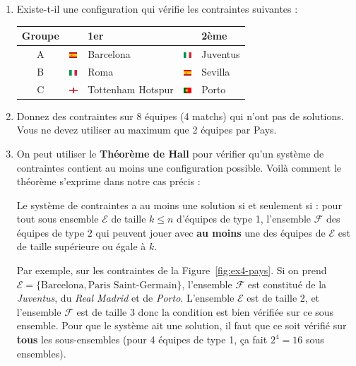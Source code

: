 \documentclass{../ficheTDTP}
\begin{document}
\begin{enumerate}
\begin{enumerate}
\begin{figure}[ht]
\end{figure}

\item Existe-t-il une configuration qui vérifie les contraintes suivantes :

\begin{tabular}{|c|ll|ll|}
\hline
Groupe & & 1er & & 2ème \\ \hline
A & \includegraphics[height=0.2cm]{flags/es.png} & Barcelona & \includegraphics[height=0.2cm]{flags/it.png} & Juventus \\ \hline
B & \includegraphics[height=0.2cm]{flags/it.png} & Roma & \includegraphics[height=0.2cm]{flags/es.png} & Sevilla \\ \hline
C & \includegraphics[height=0.2cm]{flags/en.png} & Tottenham Hotspur & \includegraphics[height=0.2cm]{flags/po.png} & Porto \\ \hline
\end{tabular}

\item Donnez des contraintes sur 8 équipes (4 matchs) qui n'ont pas de solutions. Vous ne devez utiliser au maximum que 2 équipes par Pays.

\item On peut utiliser le \textbf{Théorème de Hall} pour vérifier qu'un système de contraintes contient au moins une configuration possible. Voilà comment le théorème s'exprime dans notre cas précis :

Le système de contraintes a au moins une solution si et seulement si : pour tout sous ensemble $\mathcal{E}$ de taille $k \leq n$ d'équipes de type 1, l'ensemble $\mathcal{F}$ des équipes de type $2$ qui peuvent jouer avec \textbf{au moins} une des équipes de $\mathcal{E}$ est de taille supérieure ou égale à $k$. 

Par exemple, sur les contraintes de la Figure~\ref{fig:ex4-pays}. Si on prend $\mathcal{E} = \lbrace \text{Barcelona}, \text{Paris Saint-Germain} \rbrace$, l'ensemble $\mathcal{F}$ est constitué de la \textit{Juventus}, du \textit{Real Madrid} et de \textit{Porto}. L'ensemble $\mathcal{E}$ est de taille 2, et l'ensemble $\mathcal{F}$ est de taille 3 donc la condition est bien vérifiée sur ce sous ensemble. Pour que le système ait une solution, il faut que ce soit vérifié sur \textbf{tous} les sous-ensembles (pour 4 équipes de type 1, ça fait $2^4 = 16$ sous ensembles).


\end{enumerate}
\end{enumerate}
\end{document}
